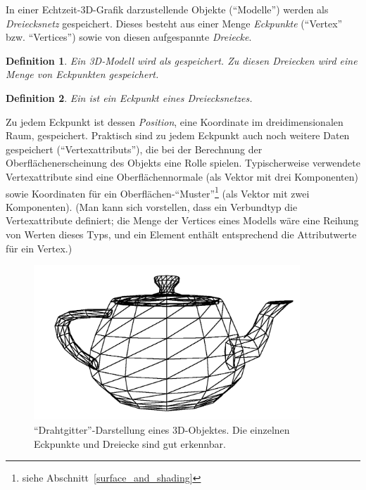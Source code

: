 \documentclass[twoside,a4paper,fleqn,12pt]{book}
\newtheorem{defn}{Definition}
\begin{document}
In einer Echtzeit-3D-Grafik darzustellende Objekte ("`Modelle"') werden als \emph{\gls{Dreiecksnetz}} gespeichert.
Dieses besteht aus einer Menge \emph{Eckpunkte} (``\gls{Vertex}'' bzw. ``Vertices'')
sowie von diesen aufgespannte \emph{Dreiecke}.

\begin{defn}
Ein \emph{3D-Modell} wird als  gespeichert.
Zu diesen Dreiecken wird eine Menge von \emph{Eckpunkten} gespeichert.
\end{defn}

\begin{defn}
Ein  ist ein Eckpunkt eines Dreiecksnetzes.
\end{defn}

Zu jedem Eckpunkt ist dessen \emph{Position}, eine Koordinate im dreidimensionalen Raum, gespeichert.
Praktisch sind zu jedem Eckpunkt auch noch weitere Daten gespeichert ("`\glspl{Vertexattribut}"'),
die bei der Berechnung der Oberflächenerscheinung des Objekts eine Rolle spielen.
Typischerweise verwendete Vertexattribute sind eine Oberflächennormale (als Vektor mit drei Komponenten)
sowie Koordinaten für ein Oberflächen-"`Muster"'\footnote{siehe Abschnitt~\ref{surface_and_shading}} (als Vektor mit zwei Komponenten).
(Man kann sich vorstellen, dass ein Verbundtyp die Vertexattribute definiert; die Menge der Vertices eines Modells wäre
eine Reihung von Werten dieses Typs, und ein Element enthält entsprechend die Attributwerte für ein Vertex.)

\begin{figure}[h]
  \centering
  \includegraphics[width=10cm]{mesh_wireframe_thick}
  \caption{"`Drahtgitter"'-Darstellung eines 3D-Objektes. Die einzelnen Eckpunkte und Dreiecke sind gut erkennbar.}
  \label{fig:wireframe_teapot}
\end{figure}
\end{document}
